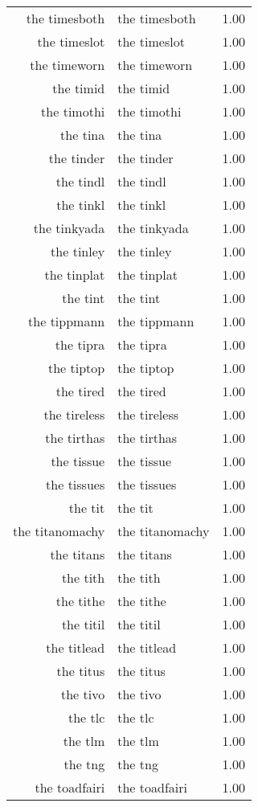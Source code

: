 \begin{table}[ht]
\begin{tabular}{rlr}
  the timesboth & the timesboth & 1.00 \\ 
  the timeslot & the timeslot & 1.00 \\ 
  the timeworn & the timeworn & 1.00 \\ 
  the timid & the timid & 1.00 \\ 
  the timothi & the timothi & 1.00 \\ 
  the tina & the tina & 1.00 \\ 
  the tinder & the tinder & 1.00 \\ 
  the tindl & the tindl & 1.00 \\ 
  the tinkl & the tinkl & 1.00 \\ 
  the tinkyada & the tinkyada & 1.00 \\ 
  the tinley & the tinley & 1.00 \\ 
  the tinplat & the tinplat & 1.00 \\ 
  the tint & the tint & 1.00 \\ 
  the tippmann & the tippmann & 1.00 \\ 
  the tipra & the tipra & 1.00 \\ 
  the tiptop & the tiptop & 1.00 \\ 
  the tired & the tired & 1.00 \\ 
  the tireless & the tireless & 1.00 \\ 
  the tirthas & the tirthas & 1.00 \\ 
  the tissue & the tissue & 1.00 \\ 
  the tissues & the tissues & 1.00 \\ 
  the tit & the tit & 1.00 \\ 
  the titanomachy & the titanomachy & 1.00 \\ 
  the titans & the titans & 1.00 \\ 
  the tith & the tith & 1.00 \\ 
  the tithe & the tithe & 1.00 \\ 
  the titil & the titil & 1.00 \\ 
  the titlead & the titlead & 1.00 \\ 
  the titus & the titus & 1.00 \\ 
  the tivo & the tivo & 1.00 \\ 
  the tlc & the tlc & 1.00 \\ 
  the tlm & the tlm & 1.00 \\ 
  the tng & the tng & 1.00 \\ 
  the toadfairi & the toadfairi & 1.00 \\ 

\end{tabular}
\end{table}
